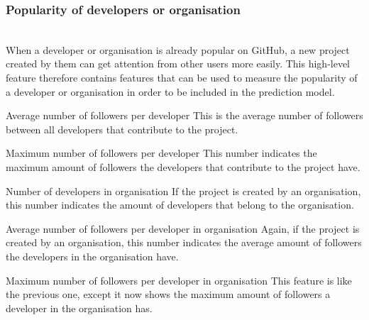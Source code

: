     \subsubsection{Popularity of developers or organisation}
    \\
    When a developer or organisation is already popular on GitHub, a new project created by them can get attention from other users more easily.
    This high-level feature therefore contains features that can be used to measure the popularity of a developer or organisation in order to be included in the prediction model.
    \begin{LaTeXdescription}
        \item[Average number of followers per developer]
        This is the average number of followers between all developers that contribute to the project.
        \item[Maximum number of followers per developer]
        This number indicates the maximum amount of followers the developers that contribute to the project have.
        \item[Number of developers in organisation]
        If the project is created by an organisation, this number indicates the amount of developers that belong to the organisation.
        \item[Average number of followers per developer in organisation]
        Again, if the project is created by an organisation, this number indicates the average amount of followers the developers in the organisation have.
        \item[Maximum number of followers per developer in organisation]
        This feature is like the previous one, except it now shows the maximum amount of followers a developer in the organisation has.
    \end{LaTeXdescription}



